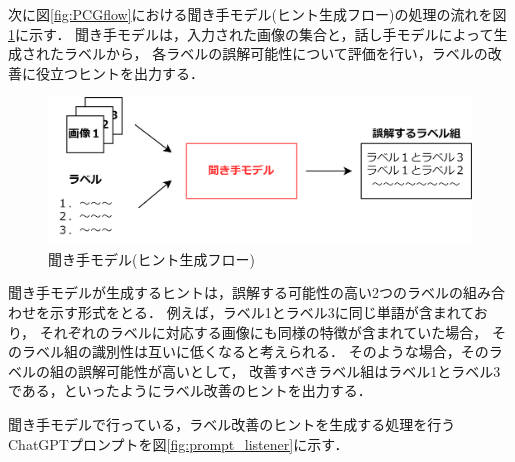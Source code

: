 \documentclass[a4paper,11pt]{jreport}
\begin{document}
次に図\ref{fig:PCGflow}における聞き手モデル(ヒント生成フロー)の処理の流れを図\ref{fig:PCGlistener}に示す．
聞き手モデルは，入力された画像の集合と，話し手モデルによって生成されたラベルから，
各ラベルの誤解可能性について評価を行い，ラベルの改善に役立つヒントを出力する．

\begin{figure}[H]
	\centering
	\includegraphics[width=0.8\linewidth]{figures/PCGlistener.png}
	\caption{聞き手モデル(ヒント生成フロー)}
	\label{fig:PCGlistener}
\end{figure}

聞き手モデルが生成するヒントは，誤解する可能性の高い2つのラベルの組み合わせを示す形式をとる．
例えば，ラベル1とラベル3に同じ単語が含まれており，
それぞれのラベルに対応する画像にも同様の特徴が含まれていた場合，
そのラベル組の識別性は互いに低くなると考えられる．
そのような場合，そのラベルの組の誤解可能性が高いとして，
改善すべきラベル組はラベル1とラベル3である，といったようにラベル改善のヒントを出力する．

聞き手モデルで行っている，ラベル改善のヒントを生成する処理を行うChatGPTプロンプトを図\ref{fig:prompt_listener}に示す．
\end{document}
